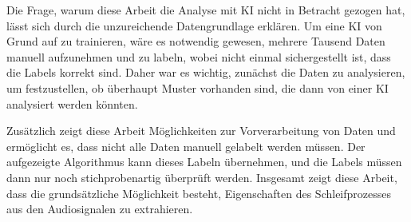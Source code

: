 Die Frage, warum diese Arbeit die Analyse mit KI nicht in Betracht gezogen hat, lässt sich durch die unzureichende Datengrundlage erklären. Um eine KI von Grund auf zu trainieren, wäre es notwendig gewesen, mehrere Tausend Daten manuell aufzunehmen und zu labeln, wobei nicht einmal sichergestellt ist, dass die Labels korrekt sind. Daher war es wichtig, zunächst die Daten zu analysieren, um festzustellen, ob überhaupt Muster vorhanden sind, die dann von einer KI analysiert werden könnten.

Zusätzlich zeigt diese Arbeit Möglichkeiten zur Vorverarbeitung von Daten und ermöglicht es, dass nicht alle Daten manuell gelabelt werden müssen. Der aufgezeigte Algorithmus kann dieses Labeln übernehmen, und die Labels müssen dann nur noch stichprobenartig überprüft werden. Insgesamt zeigt diese Arbeit, dass die grundsätzliche Möglichkeit besteht, Eigenschaften des Schleifprozesses aus den Audiosignalen zu extrahieren.

    
\endinput
